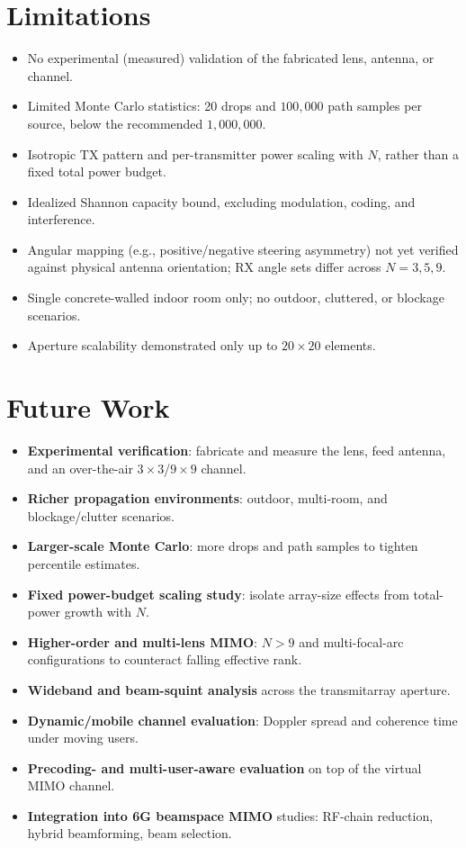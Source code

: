 \section{Limitations}
\begin{itemize}
    \item No experimental (measured) validation of the fabricated lens, antenna, or channel.
    \item Limited Monte Carlo statistics: 20 drops and $100{,}000$ path samples per source, below the recommended $1{,}000{,}000$.
    \item Isotropic TX pattern and per-transmitter power scaling with $N$, rather than a fixed total power budget.
    \item Idealized Shannon capacity bound, excluding modulation, coding, and interference.
    \item Angular mapping (e.g., positive/negative steering asymmetry) not yet verified against physical antenna orientation; RX angle sets differ across $N=3,5,9$.
    \item Single concrete-walled indoor room only; no outdoor, cluttered, or blockage scenarios.
    \item Aperture scalability demonstrated only up to $20\times20$ elements.
\end{itemize}

\section{Future Work}
\begin{itemize}
    \item \textbf{Experimental verification}: fabricate and measure the lens, feed antenna, and an over-the-air $3\times3$/$9\times9$ channel.
    \item \textbf{Richer propagation environments}: outdoor, multi-room, and blockage/clutter scenarios.
    \item \textbf{Larger-scale Monte Carlo}: more drops and path samples to tighten percentile estimates.
    \item \textbf{Fixed power-budget scaling study}: isolate array-size effects from total-power growth with $N$.
    \item \textbf{Higher-order and multi-lens MIMO}: $N>9$ and multi-focal-arc configurations to counteract falling effective rank.
    \item \textbf{Wideband and beam-squint analysis} across the transmitarray aperture.
    \item \textbf{Dynamic/mobile channel evaluation}: Doppler spread and coherence time under moving users.
    \item \textbf{Precoding- and multi-user-aware evaluation} on top of the virtual MIMO channel.
    \item \textbf{Integration into 6G beamspace MIMO} studies: RF-chain reduction, hybrid beamforming, beam selection.
\end{itemize}
